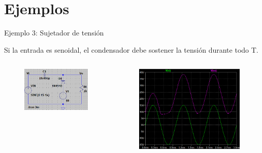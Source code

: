 \documentclass[t,aspectratio=169]{beamer}
\begin{document}
\section{Ejemplos}
\begin{frame}{Ejemplo 3: Sujetador de tensión}

Si la entrada es senoidal, el condensador debe sostener la tensión durante todo T.

\begin{columns}
\begin{column}{0.5\textwidth}

\begin{figure}
    \centering
    \includegraphics[width=\textwidth]{figures/sujetador_ejemplo_1.png}
\end{figure}
    
\end{column}
\begin{column}{0.5\textwidth}

\begin{figure}
    \centering
    \includegraphics[width=\textwidth]{figures/sujetador_ejemplo_2.png}
\end{figure}

\end{column}    
\end{columns}
    
\end{frame}
\end{document}
